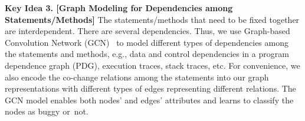 {\bf Key Idea 3. [Graph Modeling for Dependencies among Statements/Methods]} The
statements/methods that need to be fixed together are
interdependent. There are several dependencies. Thus, we
use Graph-based Convolution Network (GCN)~\cite{li2019gcn} to model
different types of dependencies among the statements and methods,
e.g., data and control dependencies in a program dependence graph
(PDG), execution traces, stack traces, etc. For convenience, we also
encode the co-change relations among the statements into our graph
representations with different types of edges representing different
relations. The GCN model enables both nodes' and edges' attributes and
learns to classify the nodes as buggy or~not.










